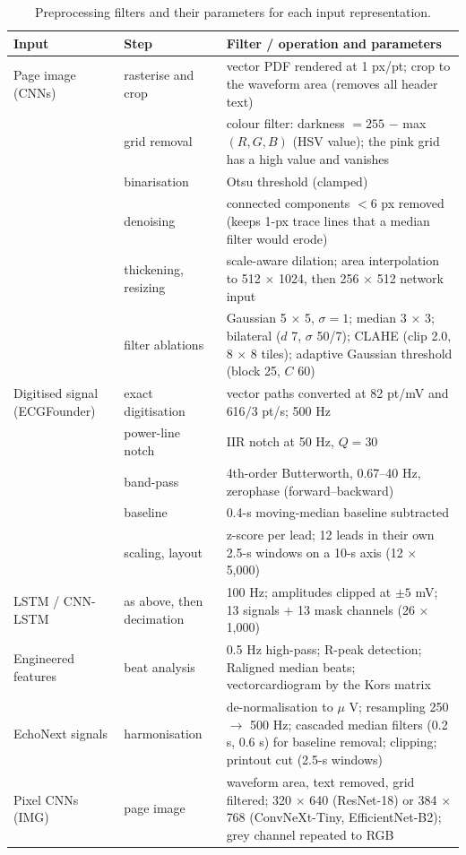 \begin{table}[htbp]
\caption{Preprocessing filters and their parameters for each input representation.}\label{tab:3.1}
\small
\begin{tabular}{>{\raggedright\arraybackslash\hspace{0pt}}p{}>{\raggedright\arraybackslash\hspace{0pt}}p{}>{\raggedright\arraybackslash\hspace{0pt}}p{}}
\toprule
\textbf{Input} & \textbf{Step} & \textbf{Filter / operation and parameters} \\
\midrule
Page image (CNNs) & rasterise and crop & vector PDF rendered at 1 px/pt; crop to the waveform area (removes all header text) \\
 & grid removal & colour filter: darkness $=255$ $-$ max$(R, G, B)$ (HSV value); the pink grid has a high value and vanishes \\
 & binarisation & Otsu threshold (clamped) \\
 & denoising & connected components $<6$ px removed (keeps 1-px trace lines that a median filter would erode) \\
 & thickening, resizing & scale-aware dilation; area interpolation to 512 $\times$ 1024, then 256 $\times$ 512 network input \\
 & filter ablations & Gaussian 5 $\times$ 5, $\sigma =1$; median 3 $\times$ 3; bilateral ($ d$ 7, $\sigma$ 50/7); CLAHE (clip 2.0, 8 $\times$ 8 tiles); adaptive Gaussian threshold (block 25, $ C$ 60) \\
\midrule
Digitised signal (ECGFounder) & exact digitisation & vector paths converted at 82 pt/mV and 616$/$3 pt/s; 500 Hz \\
 & power-line notch & IIR notch at 50 Hz, $Q =30$ \\
 & band-pass & 4th-order Butterworth, 0.67--40 Hz, zerophase (forward--backward) \\
 & baseline & 0.4-s moving-median baseline subtracted \\
 & scaling, layout & z-score per lead; 12 leads in their own 2.5-s windows on a 10-s axis (12 $\times$ 5,000) \\
\midrule
LSTM / CNN-LSTM & as above, then decimation & 100 Hz; amplitudes clipped at $\pm5$ mV; 13 signals + 13 mask channels (26 $\times$ 1,000) \\
\midrule
Engineered features & beat analysis & 0.5 Hz high-pass; R-peak detection; Raligned median beats; vectorcardiogram by the Kors matrix \\
\midrule
EchoNext signals & harmonisation & de-normalisation to $\mu$ V; resampling 250 $\rightarrow$ 500 Hz; cascaded median filters (0.2 s, 0.6 s) for baseline removal; clipping; printout cut (2.5-s windows) \\
\midrule
Pixel CNNs (IMG) & page image & waveform area, text removed, grid filtered; 320 $\times$ 640 (ResNet-18) or 384 $\times$ 768 (ConvNeXt-Tiny, EfficientNet-B2); grey channel repeated to RGB \\
\bottomrule
\end{tabular}
\end{table}

